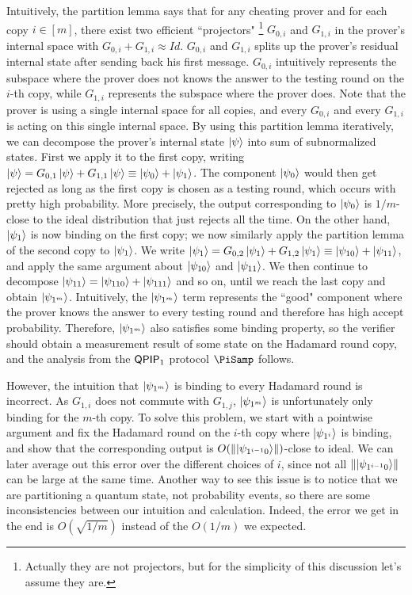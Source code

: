 Intuitively, the partition lemma says that for any cheating prover and for each copy $i\in[m]$, there exist two efficient ``projectors" \footnote{Actually they are not projectors, but for the simplicity of this discussion let's assume they are.} $G_{0,i}$ and $G_{1,i}$ in the prover's internal space with $G_{0,i}+G_{1,i} \approx Id$. $G_{0,i}$ and $G_{1,i}$ splits up the prover's residual internal state after sending back his first message.
$G_{0,i}$ intuitively represents the subspace where the prover does not knows the answer to the testing round on the $i$-th copy, while $G_{1,i}$ represents the subspace where the prover does. Note that the prover is using a single internal space for all copies, and every $G_{0,i}$ and every $G_{1,i}$ is acting on this single internal space. 
By using this partition lemma iteratively, we can decompose the prover's internal state $\ket{\psi}$ into sum of subnormalized states.
First we apply it to the first copy, writing $\ket{\psi}=G_{0,1}\ket{\psi}+G_{1,1}\ket{\psi} \equiv \ket{\psi_0}+\ket{\psi_1}$.
The component $\ket{\psi_0}$ would then get rejected as long as the first copy is chosen as a testing round,
which occurs with pretty high probability.
More precisely, the output corresponding to $\ket{\psi_0}$ is $1/m$-close to the ideal distribution that just rejects all the time.
On the other hand, $\ket{\psi_1}$ is now binding on the first copy;
we now similarly apply the partition lemma of the second copy to $\ket{\psi_1}$.
We write $\ket{\psi_1}=G_{0,2}\ket{\psi_1}+G_{1,2}\ket{\psi_1}\equiv \ket{\psi_{10}}+\ket{\psi_{11}}$, and apply the same argument about $\ket{\psi_{10}}$ and $\ket{\psi_{11}}$.
We then continue to decompose $\ket{\psi_{11}}=\ket{\psi_{110}}+\ket{\psi_{111}}$ and so on, until we reach the last copy and obtain $\ket{\psi_{1^m}}$.
Intuitively, the $\ket{\psi_{1^m}}$ term represents the ``good" component where the prover knows the answer to every testing round and therefore has high accept probability. Therefore, $\ket{\psi_{1^m}}$ also satisfies some binding property,
so the verifier should obtain a measurement result of some state on the Hadamard round copy,
and the analysis from the $\operatorname{\mathsf{QPIP}}_1$ protocol $\PiSamp$ follows.

However, the intuition that $\ket{\psi_{1^m}}$ is binding to every Hadamard round is incorrect. As $G_{1,i}$ does not commute with $G_{1,j}$, $\ket{\psi_{1^m}}$ is unfortunately only binding for the $m$-th copy.
To solve this problem, we start with a pointwise argument and fix the Hadamard round on the $i$-th copy where $\ket{\psi_{1^i}}$ is binding,
and show that the corresponding output is $O(\left\lVert\ket{\psi_{1^{i-1}0}}\right\rVert)$-close to ideal.
We can later average out this error over the different choices of $i$, since not all $\left\lVert\ket{\psi_{1^{i-1}0}}\right\rVert$ can be large at the same time. Another way to see this issue is to notice that we are partitioning a quantum state, not probability events, so there are some inconsistencies between our intuition and calculation. Indeed, the error we get in the end is $O(\sqrt{1/m})$ instead of the $O(1/m)$ we expected. 



